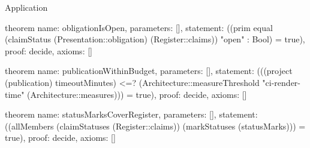 \begin{lexlean}{Application}
\begin{semanticmodule}
theorem{
  name: obligationIsOpen,
  parameters: [],
  statement: ((prim equal (claimStatus (Presentation::obligation) (Register::claims)) "open" : Bool) = true),
  proof: decide{},
  axioms: []
}

theorem{
  name: publicationWithinBudget,
  parameters: [],
  statement: (((project (publication) timeoutMinutes) <=? (Architecture::measureThreshold "ci-render-time" (Architecture::measures))) = true),
  proof: decide{},
  axioms: []
}

theorem{
  name: statusMarksCoverRegister,
  parameters: [],
  statement: ((allMembers (claimStatuses (Register::claims)) (markStatuses (statusMarks))) = true),
  proof: decide{},
  axioms: []
}
\end{semanticmodule}
\end{lexlean}
